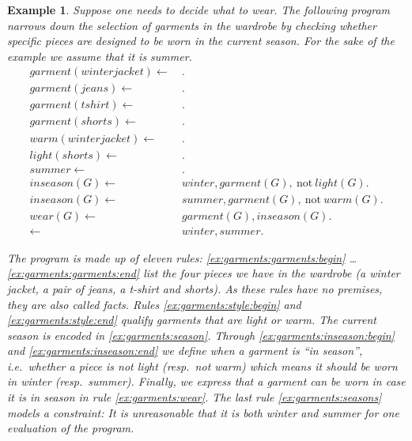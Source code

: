 \documentclass[final]{vutinfth} %
\newtheorem{example}{Example}[chapter]
\newcommand{\fail}{\mathrm{not } \ \xspace}
\newcommand{\from}{\ensuremath{\leftarrow}}
\begin{document}
\begin{example}
\label{ex:garments}
Suppose one needs to decide what to wear. The following program narrows down the selection of garments in the wardrobe by checking whether specific pieces are designed to be worn in the current season. For the sake of the example we assume that it is summer.
\begin{align}
garment(winterjacket)\from& \ .\tag{$f_1$}\label{ex:garments:garments:begin}\\
garment(jeans)\from& \ .\tag{$f_2$}\\
garment(tshirt)\from& \ .\tag{$f_3$}\\
garment(shorts)\from& \ .\tag{$f_4$}\label{ex:garments:garments:end}\\
warm(winterjacket)\from& \ .\tag{$f_5$}\label{ex:garments:style:begin}\\
light(shorts)\from& \ .\tag{$f_6$}\label{ex:garments:style:end}\\
summer\from& \ .\tag{$f_7$}\label{ex:garments:season}\\
inseason(G) \from& \ winter, garment(G),~\fail light(G). \tag{$r_1$}\label{ex:garments:inseason:begin}\\
inseason(G) \from& \ summer, garment(G),~\fail warm(G). \tag{$r_2$}\label{ex:garments:inseason:end}\\
wear(G) \from& \ garment(G), inseason(G). \tag{$r_3$}\label{ex:garments:wear}\\
\from& \ winter, summer. \tag{$c_1$}\label{ex:garments:seasons}
\end{align}

The program is made up of eleven rules: \ref{ex:garments:garments:begin} \ldots \ref{ex:garments:garments:end} list the four pieces we have in the wardrobe (a winter jacket, a pair of jeans, a t-shirt and shorts). As these rules have no premises, they are also called \emph{facts}. Rules \ref{ex:garments:style:begin} and \ref{ex:garments:style:end} qualify garments that are light or warm. The current season is encoded in \ref{ex:garments:season}. Through \ref{ex:garments:inseason:begin} and \ref{ex:garments:inseason:end} we define when a garment is \enquote{in season}, i.e.~whether a piece is not light (resp.~not warm) which means it should be worn in winter (resp.~summer). Finally, we express that a garment can be worn in case it is in season in rule \ref{ex:garments:wear}. The last rule \ref{ex:garments:seasons} models a \emph{constraint}: It is unreasonable that it is both winter and summer for one evaluation of the program.
\end{example}
\end{document}

